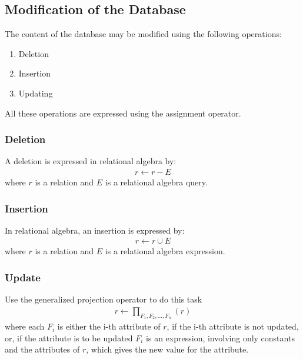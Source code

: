 \subsection{Modification of the Database}
The content of the database may be modified using the following operations:
\begin{enumerate}
    \item Deletion
    \item Insertion
    \item Updating
\end{enumerate}
All these operations are expressed using the assignment operator.

\subsubsection{Deletion}

A deletion is expressed in relational algebra by:
\begin{align*}
    r \leftarrow r - E
\end{align*}
where $r$ is a relation and $E$ is a relational algebra query.

\subsubsection{Insertion}
In relational algebra, an insertion is expressed by:
\begin{align*}
    r \leftarrow r \cup E
\end{align*}
where $r$ is a relation and $E$ is a relational algebra expression.

\subsubsection{Update}
Use the generalized projection operator to do this task
\begin{align*}
    r \leftarrow \prod_{F_1,F_2,\dots,F_n} (r)
\end{align*}
where each $F_i$ is either the i-th attribute of $r$, if the i-th attribute is not updated, or, if the attribute is to be updated $F_i$ is an expression, involving only constants and the attributes of $r$, which gives the new value for the attribute.


